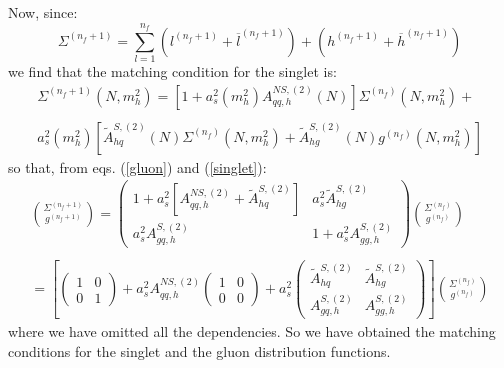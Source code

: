 \documentclass[10pt,a4paper]{article}
\begin{document}
Now, since:
\begin{equation}
\Sigma^{(n_f+1)}=\sum_{l=1}^{n_f}(l^{(n_f+1)}+\overline{l}^{(n_f+1)})+(h^{(n_f+1)}+\overline{h}^{(n_f+1)})
\end{equation}
we find that the matching condition for the singlet is:
\begin{equation}
\begin{array}{c}
\displaystyle\Sigma^{(n_f+1)}(N,m_h^2)=[1+a_s^2(m_h^2)A_{qq,h}^{N\!S,(2)}(N)]\Sigma^{(n_f)}(N,m_h^2)+\\
\\
\displaystyle a_s^2(m_h^2)[\tilde{A}^{S,(2)}_{hq}(N)\Sigma^{(n_f)}(N,m_h^2)+\tilde{A}^{S,(2)}_{hg}(N)g^{(n_f)}(N,m_h^2)]
\end{array}
\label{singlet}
\end{equation}
so that, from eqs. (\ref{gluon}) and (\ref{singlet}):
\begin{equation}
\begin{array}{c}
\displaystyle {\Sigma^{(n_f+1)} \choose g^{(n_f+1)}}=\begin{pmatrix}1+a_s^2[A_{qq,h}^{N\!S,(2)}+\tilde{A}^{S,(2)}_{hq}] & a_s^2\tilde{A}^{S,(2)}_{hg}\\
a_s^2A^{S,(2)}_{gq,h} & 1+a_s^2A_{gg,h}^{S,(2)}\end{pmatrix}{\Sigma^{(n_f)} \choose g^{(n_f)}}\\
\\
\displaystyle =\left[\begin{pmatrix} 1 & 0 \\ 0 & 1\end{pmatrix}+a_s^2A_{qq,h}^{N\!S,(2)}\begin{pmatrix} 1 & 0 \\ 0 & 0\end{pmatrix}+a_s^2\begin{pmatrix} \tilde{A}^{S,(2)}_{hq} & \tilde{A}^{S,(2)}_{hg} \\A^{S,(2)}_{gq,h} & A_{gg,h}^{S,(2)}\end{pmatrix}\right]{\Sigma^{(n_f)} \choose g^{(n_f)}}
\end{array}
\label{couple1}
\end{equation}
where we have omitted all the dependencies. So we have obtained the
matching conditions for the singlet and the gluon distribution
functions.
\end{document}
